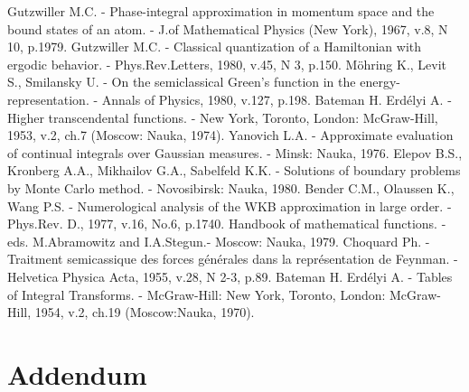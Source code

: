 \documentclass[11pt]{article}
\begin{document}
\begin{thebibliography}{99}
 Gutzwiller M.C. - Phase-integral approximation in momentum space
             and the bound states of an atom. -
             J.of Mathematical Physics (New York), 1967, v.8, N 10, p.1979.
 Gutzwiller M.C. - Classical quantization of a Hamiltonian with
             ergodic behavior. - Phys.Rev.Letters, 1980, v.45, N 3, p.150.
 M\"{o}hring K., Levit S., Smilansky U. -  On the semiclassical Green's
             function in the energy-representation. - Annals of Physics, 1980,                    v.127, p.198.
 Bateman H. Erd\'elyi A. - Higher transcendental functions. -
             New York, Toronto, London: McGraw-Hill,  1953, v.2, ch.7
             (Moscow: Nauka, 1974).
 Yanovich L.A. - Approximate evaluation of continual integrals over
    Gaussian measures. -  Minsk: Nauka, 1976.
 Elepov B.S., Kronberg A.A., Mikhailov G.A., Sabelfeld K.K. -
             Solutions of boundary problems by Monte Carlo method. -
             Novosibirsk: Nauka, 1980.
 Bender C.M., Olaussen K., Wang P.S. - Numerological analysis of the
             WKB approximation in large order. -
             Phys.Rev. D., 1977, v.16, No.6, p.1740.
 Handbook of mathematical functions. - eds. M.Abramowitz
             and I.A.Stegun.- Moscow:  Nauka, 1979.
 Choquard Ph.  - Traitment semicassique des forces g\'{e}n\'{e}rales
             dans la repr\'{e}sentation de Feynman. -  Helvetica Physica Acta, 1955,
             v.28, N 2-3, p.89.
 Bateman H. Erd\'elyi A. - Tables of Integral
             Transforms. - McGraw-Hill: New York, Toronto, London: McGraw-Hill, 1954,
             v.2, ch.19  (Moscow:Nauka, 1970).

\end{thebibliography}


\section*{Addendum}
\end{document}

